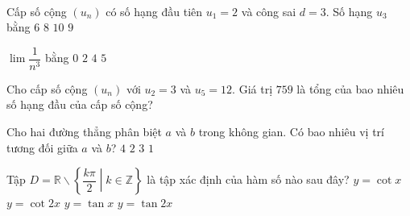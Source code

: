 ﻿﻿\begin{name}
	{\tenchude}
	{\tendethi}
	{\tentruong}
	{\thoigian}
\end{name}
\setcounter{ex}{0}\setcounter{bt}{0}
\begin{ex}%
	Cấp số cộng $(u_n)$ có số hạng đầu tiên $u_1=2$ và công sai $d=3$. Số hạng $u_3$ bằng
	\choice
	{$6$}
	{\True $8$}
	{$10$}
	{$9$}
\end{ex}

\begin{ex}%
	$\lim\dfrac{1}{n^3}$ bằng
	\choice
	{\True $0$}
	{$2$}
	{$4$}
	{$5$}
\end{ex}

\begin{ex}%
	Cho cấp số cộng $(u_n)$ với $u_2=3$ và $u_5=12$. Giá trị $759$ là tổng của bao nhiêu số hạng đầu của cấp số cộng?
\end{ex}

\begin{ex}%
	Cho hai đường thẳng phân biệt $a$ và $b$ trong không gian. Có bao nhiêu vị trí tương đối giữa $a$ và $b$?
	\choice
	{$4$}
	{$2$}
	{\True $3$}
	{$1$}
\end{ex}

\begin{ex}%
	Tập $D=\mathbb{R}\backslash \left\{ \dfrac{k\pi }{2}\middle| k\in \mathbb{Z} \right\}$ là tập xác định của hàm số nào sau đây?
	\choice
	{ $y=\cot x$}
	{\True  $y=\cot 2x$}
	{ $y=\tan x$}
	{ $y=\tan 2x$}
\end{ex}

